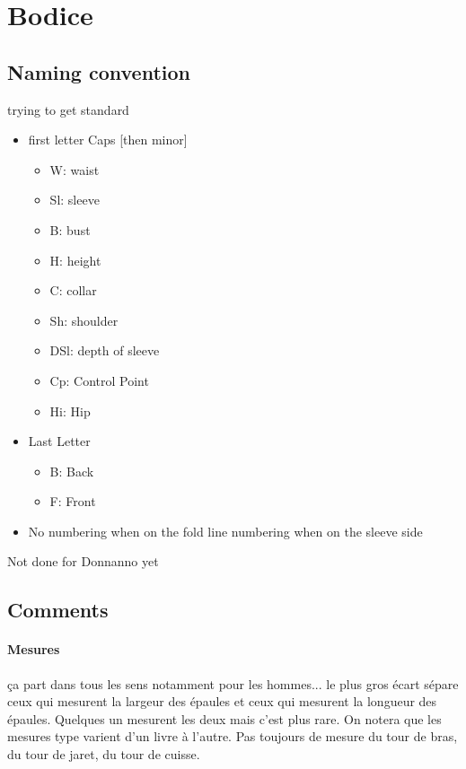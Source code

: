 \documentclass[11pt,a4paper]{article}
\begin{document}
\section{Bodice}  

\subsection{Naming convention}

trying to get standard
\begin{itemize}
\item		first letter Caps [then minor]
\begin{itemize}
\item		W: waist
\item		Sl: sleeve
\item		B: bust
\item		H: height
\item		C: collar
\item		Sh: shoulder
\item		DSl: depth of sleeve
\item		Cp: Control Point
\item		Hi: Hip
\end{itemize}
		
\item		Last Letter
\begin{itemize}
\item		B: Back
\item		F: Front
\end{itemize}
		
\item		No numbering when on the fold line numbering when on the sleeve side
\end{itemize}


Not done for Donnanno yet

\subsection{Comments}

\paragraph{Mesures}
ça part dans tous les sens notamment pour les hommes... le plus gros écart sépare ceux qui mesurent la largeur des épaules et ceux qui mesurent la longueur des épaules. Quelques un mesurent les deux mais c'est plus rare. On notera que les mesures type varient d'un livre à l'autre. Pas toujours de mesure du tour de bras, du tour de jaret, du tour de cuisse.
\end{document}
